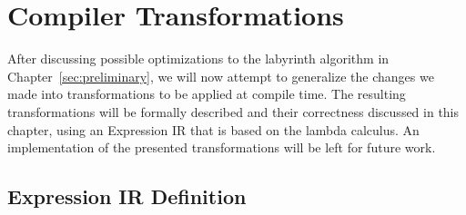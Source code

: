 %
\chapter{Compiler Transformations}
\label{sec:transformations}

After discussing possible optimizations to the labyrinth algorithm in Chapter~\ref{sec:preliminary}, we will now attempt to generalize the changes we made into transformations to be applied at compile time.
The resulting transformations will be formally described and their correctness discussed in this chapter, using an Expression IR that is based on the lambda calculus.
An implementation of the presented transformations will be left for future work.

\section{Expression IR Definition}%
\label{sec:transformations:expression-ir}

